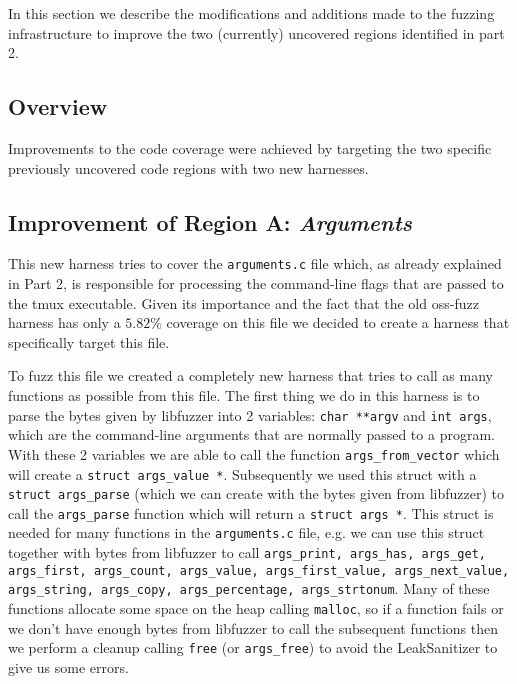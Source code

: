 In this section we describe the modifications and additions made to the fuzzing infrastructure to improve the two (currently) uncovered regions identified in part 2.

\subsection*{Overview}

Improvements to the code coverage were achieved by targeting the two specific previously uncovered code regions with two new harnesses.

\subsection*{Improvement of Region A: \textit{Arguments}}

This new harness tries to cover the \texttt{arguments.c} file which, as already explained in Part 2, is responsible for processing the command-line flags that are passed to the tmux executable. Given its importance and the fact that the old oss-fuzz harness has only a $5.82\%$ coverage on this file we decided to create a harness that specifically target this file.

To fuzz this file we created a completely new harness that tries to call as many functions as possible from this file. The first thing we do in this harness is to parse the bytes given by libfuzzer into 2 variables: \texttt{char **argv} and \texttt{int args}, which are the command-line arguments that are normally passed to a program. With these 2 variables we are able to call the function \texttt{args\_from\_vector} which will create a \texttt{struct args\_value *}. Subsequently we used this struct with a \texttt{struct args\_parse} (which we can create with the bytes given from libfuzzer) to call the
\texttt{args\_parse} function which will return a \texttt{struct args *}. This struct is needed for many functions in the \texttt{arguments.c} file, e.g. we can use this struct together with bytes from libfuzzer to call \texttt{args\_print, args\_has, args\_get, args\_first, args\_count, args\_value,  args\_first\_value, args\_next\_value,  args\_string, args\_copy, args\_percentage, args\_strtonum}. Many of these functions allocate some space on the heap calling \texttt{malloc}, so if a function fails or we don't have enough bytes from libfuzzer to call the subsequent functions then we perform a cleanup calling \texttt{free} (or \texttt{args\_free}) to avoid the LeakSanitizer to give us some errors.

